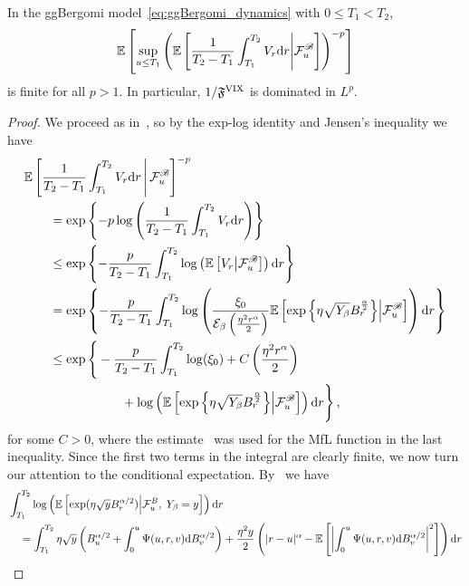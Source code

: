 \begin{lemma}\label{lem:AssOneAsy}
    In the ggBergomi model~\eqref{eq:ggBergomi_dynamics} with $0 \leq T_1<T_2$,
    \[
    \mathbb{E}\left[\sup _{u \leq T_1}\left(\mathbb{E}\left[\frac{1}{T_2-T_1} \int_{T_1}^{T_2} V_r \mathrm{d} r\middle\vert \mathcal{F}^{\mathscr{B}}_u\right]\right)^{-p}\right]
    \]
    is finite for all $p>1$. In particular, $1 / \mathfrak{F}^{\mathrm{VIX}}$ is dominated in $L^p$.
\end{lemma}
\begin{proof}
    We proceed as in~\cite[Lemma~6.14]{Jacquier2021RoughOptions}, so by the exp-log identity and Jensen's inequality we have
    \begin{align*}
    &\mathbb{E}\left[\frac{1}{T_2-T_1} \int_{T_1}^{T_2} V_r \mathrm{d} r \, \middle\vert \, \mathcal{F}^{\mathscr{B}}_u\right]^{-p} \\
    &\qquad = \exp \left\{-p \log \left(\frac{1}{T_2-T_1} \int_{T_1}^{T_2} V_r \mathrm{d} r\right)\right\} \\
    &\qquad \leq \exp \left\{-\frac{p}{T_2-T_1} \int_{T_1}^{T_2} \log \left(\mathbb{E}\left[V_r\middle\vert \mathcal{F}^{\mathscr{B}}_u\right]\right) \mathrm{d} r\right\} \\
    &\qquad = \exp \left\{-\frac{p}{T_2-T_1} \int_{T_1}^{T_2} \log \left(\frac{\xi_0}{\mathcal{E}_{\beta}\left(\frac{\eta^2 r^\alpha}{2}\right)}\mathbb{E}\left[\exp\left\{\eta\sqrt{Y_{\beta}} B^{\frac\alpha2}_r\right\}\middle\vert \mathcal{F}^{\mathscr{B}}_u\right]\right) \mathrm{d} r\right\} \\
    &\qquad  \leq \exp \Bigg\{-\frac{p}{T_2-T_1} \int_{T_1}^{T_2} \log(\xi_0) + C\left(\frac{\eta^2 r^\alpha}{2}\right) \\
    &\qquad  \hspace*{2cm} + \log \left(\mathbb{E}\left[\exp\left\{\eta\sqrt{Y_{\beta}} B^{\frac\alpha2}_r\right\}\middle\vert \mathcal{F}^{\mathscr{B}}_u\right]\right) \mathrm{d} r\Bigg\}\,,
    \end{align*}
    for some $C>0$, where the estimate~\cite[Theorem~9]{Jia2019SomeFunction} was used for the MfL function in the last inequality. Since the first two terms in the integral are clearly finite, we now turn our attention to the conditional expectation. By~\cite[Theorem 3.1]{Fink2013ConditionalMotion} we have
\begin{align*}
    &\int_{T_1}^{T_2}\log\left(\EE\left[\exp(\eta\sqrt{y} B_r^{\alpha/2})\middle\vert \Ff_u^B,\; Y_\beta = y\right]\right) \D r \\
    &\quad = \int_{T_1}^{T_2} \eta\sqrt{y}\left(B_u^{\alpha/2} + \int_0^u \Psi(u,r,v)\D B_v^{\alpha/2}\right) + \frac{\eta^2 y}{2}\left(|r-u|^\alpha - \EE\left[\left|\int_0^u \Psi(u,r,v)\D B_v^{\alpha/2}\right|^2\right]\right) \D r

\end{align*}
\end{proof}
